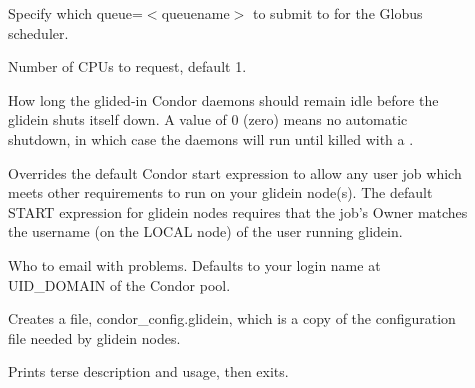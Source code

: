 \begin{description}
\item[]
	Specify which queue=$<$queuename$>$ to submit to for the Globus scheduler.

\item[]
	Number of CPUs to request, default 1.

\item[]
	How long the glided-in Condor daemons should remain idle before the
	glidein shuts itself down. A value of 0 (zero) means no automatic shutdown,
	in which case the daemons will run until killed with a .

\item[]
	Overrides the default Condor start expression to allow any user job which
	meets other requirements to run on your glidein node(s). The default START
	expression for glidein nodes requires that the job's Owner matches the
	username (on the LOCAL node) of the user running glidein.

\item[]
	Who to email with problems. Defaults to your login name at UID\_DOMAIN of the Condor pool.

\item[]
	Creates a file, condor\_config.glidein, which is a copy of the configuration
	file needed by glidein nodes.

\item[]
   Prints terse description and usage, then exits.
\end{description}
